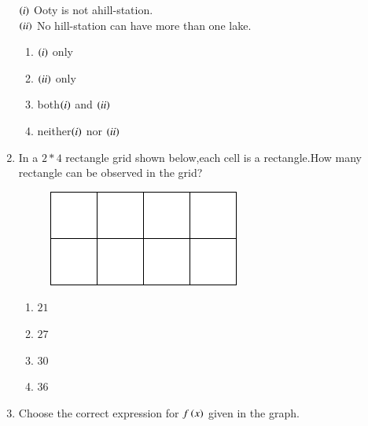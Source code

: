 \documentclass[journal,12pt,twocolumn]{IEEEtran}
\theoremstyle{remark}
\begin{document}
\begin{enumerate}
    $\left(i\right)$ Ooty is not ahill-station.\\
    $\left(ii\right)$ No hill-station can have more than one lake.
    \begin{enumerate}
        \item $\left(i\right)$ only\\
        \item$\left(ii\right)$ only\\
        \item both$\left(i\right)$ and $\left(ii\right)$\\
        \item neither$\left(i\right)$ nor $\left(ii\right)$
    \end{enumerate}
    \item In a $2 * 4$ rectangle grid shown below,each cell is a rectangle.How many rectangle can be observed in the grid?\\   
    

\begin{figure}[h!]
        \centering
        \includegraphics[width=0.7\linewidth]{figure/fig1/fig1.pdf}
		\caption{}
        \label{stemplot}
\end{figure}
 \begin{enumerate}
    \item$21$\\
    \item$27$\\
    \item$30$\\
    \item$36$
    \end{enumerate}
    \item Choose the correct expression for $f\left(x\right)$ given in the graph.


\end{enumerate}
\end{document}
